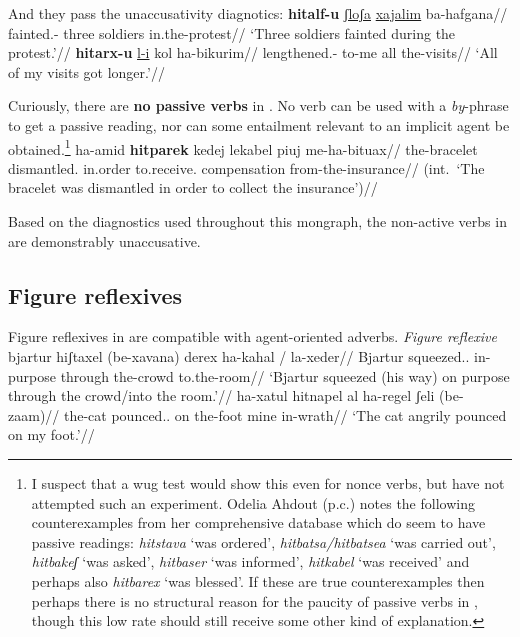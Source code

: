 And they pass the unaccusativity diagnotics:
\ex
	\begingl
	\gla \textbf{hitalf-u} \underline{ʃloʃa} \underline{xajalim} ba-hafgana//
	\glb fainted.- three soldiers in.the-protest//
	\glft `Three soldiers fainted during the protest.'//
	\endgl
\xe
\ex \begingl
	\gla \textbf{hitarx-u} \underline{l-i} kol ha-bikurim//
	\glb lengthened.- to-me all the-visits//
	\glft `All of my visits got longer.'//
	\endgl
\xe

Curiously, there are \textbf{no passive verbs} in {\thit}. No verb can be used with a \emph{by}-phrase to get a passive reading, nor can some entailment relevant to an implicit agent be obtained.\footnote{I suspect that a wug test would show this even for nonce verbs, but have not attempted such an experiment. Odelia Ahdout (p.c.) notes the following counterexamples from her comprehensive database which do seem to have passive readings: \emph{hitstava} `was ordered', \emph{hitbatsa/hitbatsea} `was carried out', \emph{hitbakeʃ} `was asked', \emph{hitbaser} `was informed', \emph{hitkabel} `was received' and perhaps also \emph{hitbarex} `was blessed'. If these are true counterexamples then perhaps there is no structural reason for the paucity of passive verbs in {\thit}, though this low rate should still receive some other kind of explanation.}
\ex	\ljudge{*} \begingl
	\gla ha-{\ts}amid \textbf{hitparek} kedej lekabel pi{\ts}uj me-ha-bituax//
	\glb the-bracelet dismantled. in.order to.receive. compensation from-the-insurance//
	\glft (int.~`The bracelet was dismantled in order to collect the insurance')//
	\endgl
\xe

Based on the diagnostics used throughout this mongraph, the non-active verbs in {\thit} are demonstrably unaccusative.

	\subsection{Figure reflexives} \label{vz:thit:figrefl}
Figure reflexives in {\thit} are compatible with agent-oriented adverbs.
\pex\label{ex:vz:figrefl-va}\textit{Figure reflexive}
	\a \begingl
		\gla bjartur hiʃtaxel (be-xavana) derex ha-kahal / la-xeder//
		\glb Bjartur squeezed.. in-purpose through the-crowd {} to.the-room//
		\glft `Bjartur squeezed (his way) on purpose through the crowd/into the room.'//
		\endgl
	\a \begingl
		\gla ha-xatul hitnapel al ha-regel ʃeli (be-zaam)//
		\glb the-cat pounced.. on the-foot mine in-wrath//
		\glft `The cat angrily pounced on my foot.'//
		\endgl
\xe

